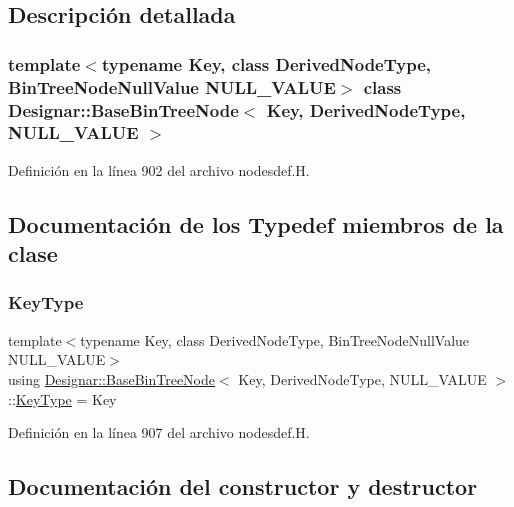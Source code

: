 \subsection{Descripción detallada}
\subsubsection*{template$<$typename Key, class Derived\+Node\+Type, Bin\+Tree\+Node\+Null\+Value N\+U\+L\+L\+\_\+\+V\+A\+L\+UE$>$\newline
class Designar\+::\+Base\+Bin\+Tree\+Node$<$ Key, Derived\+Node\+Type, N\+U\+L\+L\+\_\+\+V\+A\+L\+U\+E $>$}



Definición en la línea 902 del archivo nodesdef.\+H.



\subsection{Documentación de los \textquotesingle{}Typedef\textquotesingle{} miembros de la clase}
\mbox{\label{class_designar_1_1_base_bin_tree_node_adc177cc1f4ed5bb9baf467a2ff6e4e85}} 
\subsubsection{\texorpdfstring{Key\+Type}{KeyType}}
{\footnotesize\ttfamily template$<$typename Key, class Derived\+Node\+Type, Bin\+Tree\+Node\+Null\+Value N\+U\+L\+L\+\_\+\+V\+A\+L\+UE$>$ \\
using \hyperlink{class_designar_1_1_base_bin_tree_node}{Designar\+::\+Base\+Bin\+Tree\+Node}$<$ Key, Derived\+Node\+Type, N\+U\+L\+L\+\_\+\+V\+A\+L\+UE $>$\+::\hyperlink{class_designar_1_1_base_bin_tree_node_adc177cc1f4ed5bb9baf467a2ff6e4e85}{Key\+Type} =  Key}



Definición en la línea 907 del archivo nodesdef.\+H.



\subsection{Documentación del constructor y destructor}
\mbox{\label{class_designar_1_1_base_bin_tree_node_a2779b1f30e23443940aaa0ddfec895be}} 
